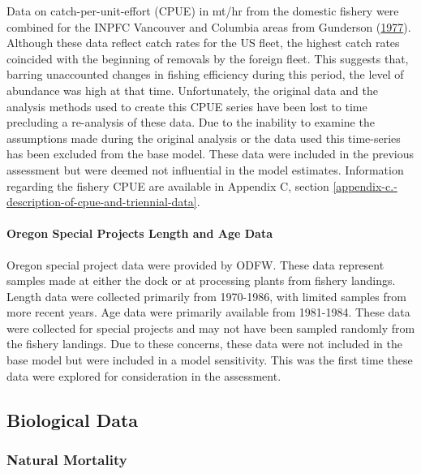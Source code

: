 \documentclass[12pt,]{article}
\let\oldparagraph\paragraph
\renewcommand{\paragraph}[1]{\oldparagraph{#1}\mbox{}}
\begin{document}
Data on catch-per-unit-effort (CPUE) in mt/hr from the domestic fishery
were combined for the INPFC Vancouver and Columbia areas from Gunderson
(\protect\hyperlink{ref-gunderson_population_1977}{1977}). Although
these data reflect catch rates for the US fleet, the highest catch rates
coincided with the beginning of removals by the foreign fleet. This
suggests that, barring unaccounted changes in fishing efficiency during
this period, the level of abundance was high at that time.
Unfortunately, the original data and the analysis methods used to create
this CPUE series have been lost to time precluding a re-analysis of
these data. Due to the inability to examine the assumptions made during
the original analysis or the data used this time-series has been
excluded from the base model. These data were included in the previous
assessment but were deemed not influential in the model estimates.
Information regarding the fishery CPUE are available in Appendix C,
section \ref{appendix-c.-description-of-cpue-and-triennial-data}.

\paragraph{Oregon Special Projects Length and Age
Data}\label{oregon-special-projects-length-and-age-data}

Oregon special project data were provided by ODFW. These data represent
samples made at either the dock or at processing plants from fishery
landings. Length data were collected primarily from 1970-1986, with
limited samples from more recent years. Age data were primarily
available from 1981-1984. These data were collected for special projects
and may not have been sampled randomly from the fishery landings. Due to
these concerns, these data were not included in the base model but were
included in a model sensitivity. This was the first time these data were
explored for consideration in the assessment.

\subsection{Biological Data}\label{biological-data}

\subsubsection{Natural Mortality}\label{natural-mortality}
\end{document}
